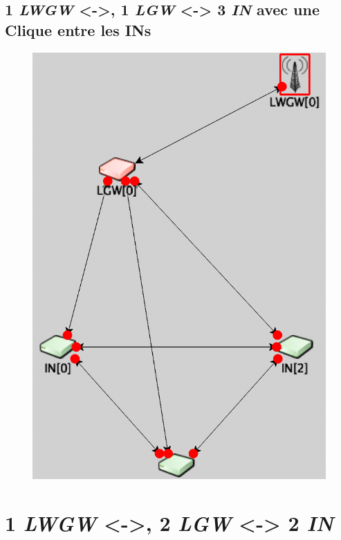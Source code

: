 \documentclass[a4paper]{article}
\begin{document}
\subsection{ 1 \textit{LWGW} <->, 1 \textit{LGW} <-> 3 \textit{IN} avec une Clique entre les INs }
\begin{figure}[h!]
\centering
\includegraphics[scale=0.5]{cas_3_2.png} 
\end{figure}


\newpage
\section{ 1 \textit{LWGW} <->, 2 \textit{LGW} <-> 2 \textit{IN} }
\end{document}
